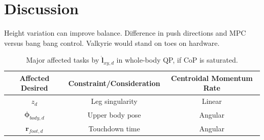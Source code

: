 \section{Discussion}
Height variation can improve balance. Difference in push directions and \ac{MPC} versus bang bang control. Valkyrie would stand on toes on hardware.
\begin{table}[h]
\caption{Major affected tasks by $\mathbf{\dot{l}}_{xy,d}$ in whole-body QP, if \ac{CoP} is saturated.} %
\centering %
\begin{tabular}{c c c } %
\hline\hline %
Affected Desired & Constraint/Consideration & Centroidal Momentum Rate \\
\hline %
 $z_d$ & Leg singularity & Linear\\
 $\boldsymbol{\phi}_{body,d}$ & Upper body pose & Angular\\
 $\mathbf{r}_{foot,d}$ &  Touchdown time & Angular\\
\hline %
\end{tabular}
\label{tab:eatqp} %
\end{table}
